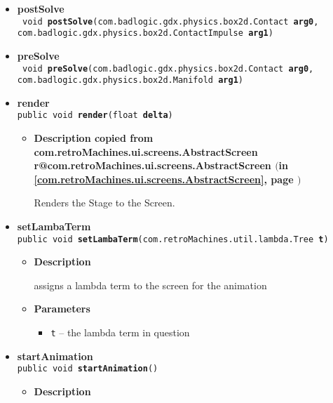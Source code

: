\documentclass[11pt,a4paper]{report}
\makeatletter
\newcommand{\refdefined}[1]{
\expandafter\ifx\csname r@#1\endcsname\relax
\relax\else
{$($in \ref{#1}, page \pageref{#1}$)$}\fi}
\makeatother
\begin{document}
{{{{{{{{{{{{{{{{{\begin{itemize}
{\begin{itemize}
{sets animationInProgress to false and freezes the animation in it's current position
}
\end{itemize}
}%
\item{ 
{\bf  postSolve}\\
\texttt{ void\ {\bf  postSolve}(\texttt{com.badlogic.gdx.physics.box2d.Contact} {\bf  arg0},
\texttt{com.badlogic.gdx.physics.box2d.ContactImpulse} {\bf  arg1})
\label{com.retroMachines.ui.screens.game.EvaluationScreen.postSolve(com.badlogic.gdx.physics.box2d.Contact, com.badlogic.gdx.physics.box2d.ContactImpulse)}}%
}%
\item{ 
{\bf  preSolve}\\
\texttt{ void\ {\bf  preSolve}(\texttt{com.badlogic.gdx.physics.box2d.Contact} {\bf  arg0},
\texttt{com.badlogic.gdx.physics.box2d.Manifold} {\bf  arg1})
\label{com.retroMachines.ui.screens.game.EvaluationScreen.preSolve(com.badlogic.gdx.physics.box2d.Contact, com.badlogic.gdx.physics.box2d.Manifold)}}%
}%
\item{ 
{\bf  render}\\
\texttt{public void\ {\bf  render}(\texttt{float} {\bf  delta})
\label{com.retroMachines.ui.screens.game.EvaluationScreen.render(float)}}%
\begin{itemize}
\item{
{\bf  Description copied from com.retroMachines.ui.screens.AbstractScreen{\small \refdefined{com.retroMachines.ui.screens.AbstractScreen}} }

Renders the Stage to the Screen.
}
\end{itemize}
}%
\item{ 
{\bf  setLambaTerm}\\
\texttt{public void\ {\bf  setLambaTerm}(\texttt{com.retroMachines.util.lambda.Tree} {\bf  t})
\label{com.retroMachines.ui.screens.game.EvaluationScreen.setLambaTerm(com.retroMachines.util.lambda.Tree)}}%
\begin{itemize}
\item{
{\bf  Description}

assigns a lambda term to the screen for the animation
}
\item{
{\bf  Parameters}
  \begin{itemize}
   \item{
\texttt{t} -- the lambda term in question}
  \end{itemize}
}%
\end{itemize}
}%
\item{ 
{\bf  startAnimation}\\
\texttt{public void\ {\bf  startAnimation}()
\label{com.retroMachines.ui.screens.game.EvaluationScreen.startAnimation()}}%
\begin{itemize}
\item{
{\bf  Description}

}
\end{itemize}}
\end{itemize}}}}}}}}}}}}}}}}}}
\end{document}
